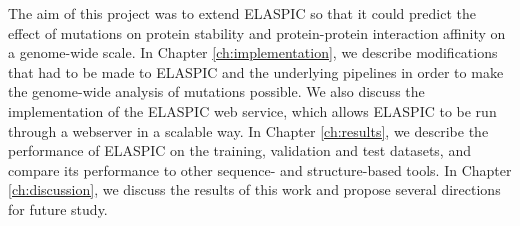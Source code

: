 The aim of this project was to extend ELASPIC so that it could predict the effect of mutations on protein stability and protein-protein interaction affinity on a genome-wide scale. In Chapter \ref{ch:implementation}, we describe modifications that had to be made to ELASPIC and the underlying pipelines in order to make the genome-wide analysis of mutations possible. We also discuss the implementation of the ELASPIC web service, which allows ELASPIC to be run through a webserver in a scalable way. In Chapter \ref{ch:results}, we describe the performance of ELASPIC on the training, validation and test datasets, and compare its performance to other sequence- and structure-based tools. In Chapter \ref{ch:discussion}, we discuss the results of this work and propose several directions for future study.
